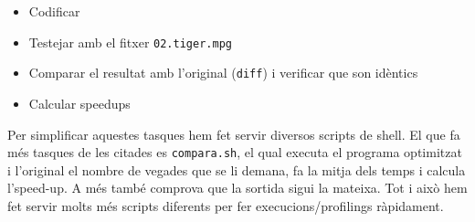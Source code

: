 \begin{itemize}
  \item Codificar
  \item Testejar amb el fitxer  \texttt{02.tiger.mpg}
  \item Comparar el resultat amb l'original (\texttt{diff}) i verificar que son idèntics
  \item Calcular speedups
\end{itemize}

Per simplificar aquestes tasques hem fet servir diversos scripts de shell. El que fa més tasques de les citades es \texttt{compara.sh}, el qual executa el programa optimitzat i l'original el nombre de vegades que se li demana, fa la mitja dels temps i calcula l'speed-up. A més també comprova que la sortida sigui la mateixa. Tot i això hem fet servir molts més scripts diferents per fer execucions/profilings ràpidament.
